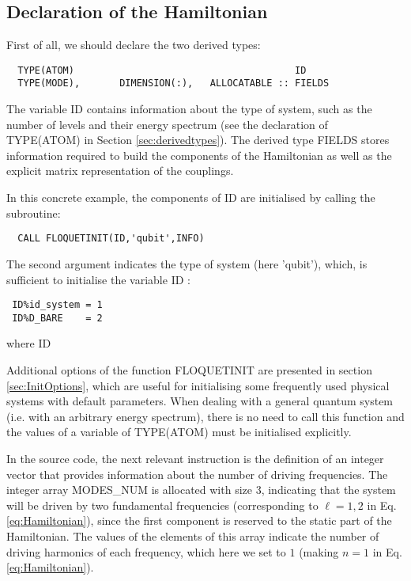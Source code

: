 \documentclass[10pt,a4paper]{article}
\begin{document}
\subsection{Declaration of the Hamiltonian \label{subsec:init}}

First of all, we should declare the two derived types:
\begin{verbatim}
  TYPE(ATOM)                                       ID
  TYPE(MODE),       DIMENSION(:),   ALLOCATABLE :: FIELDS
\end{verbatim}

\noindent 
The variable   ID  contains information about the type of system, such as the number of levels and their energy spectrum (see the declaration of   TYPE(ATOM)   in Section \ref{sec:derivedtypes}).  The derived type   FIELDS   stores information required to build the components of the Hamiltonian as well as the explicit matrix representation of the couplings.

In this concrete example, the components of   ID  are initialised by calling the subroutine:
\begin{verbatim}
  CALL FLOQUETINIT(ID,'qubit',INFO)
\end{verbatim}
The second argument indicates the type of system (here 'qubit'), which, is sufficient to initialise the variable    ID   :
\begin{verbatim}
 ID%id_system = 1 
 ID%D_BARE    = 2 
\end{verbatim}
where   ID%

Additional options of the function   FLOQUETINIT   are presented in section \ref{sec:InitOptions}, which are useful for initialising some frequently used physical systems with default parameters. When dealing with a general quantum system (i.e. with an arbitrary energy spectrum), there is no need to call this function and the values of a variable of   TYPE(ATOM)  must be initialised explicitly.

In the source code, the next relevant instruction is the definition of an integer vector that provides information about the number of driving frequencies. The integer array   MODES\_NUM   is allocated with size 3, indicating that the system will be driven by two fundamental frequencies (corresponding to $\ell = 1,2$ in Eq. \ref{eq:Hamiltonian}), since the first component is reserved to the static part of the Hamiltonian. The values of the elements of this array indicate the number of driving harmonics of each frequency, which here we set to $1$ (making $n=1$ in Eq. \ref{eq:Hamiltonian}). 
\end{document}
